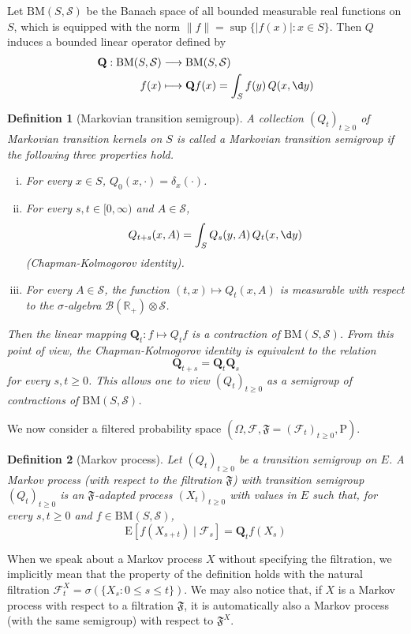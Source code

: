 \documentclass{report}
\newtheorem{definition}{Definition}[section]
\theoremstyle{nonumberplain}
\begin{document}
Let $\mathrm{BM}(S,\mathcal{S})$ be the Banach space of all bounded measurable real functions on $S$, which is equipped with the norm $\|f\|=\sup \{|f(x)|: x \in S\}$. Then $Q$ induces a bounded linear operator defined by
\begin{align*}
	\mathbf{Q}:\mathrm{BM}(S,\mathcal{S}) &\longrightarrow\mathrm{BM}(S,\mathcal{S}) \\
	f(x) &\longmapsto \mathbf{Q}f(x)=\int_S f(y)\,Q(x,\d y)
\end{align*}

\begin{definition}[Markovian transition
	semigroup]
	A collection $\left(Q_t\right)_{t \geq 0}$ of Markovian transition kernels on $S$ is called a \emph{Markovian transition semigroup} if the following three properties hold.
	\begin{enumerate}[(i)]
	\item For every $x \in S$, $Q_0(x, \cdot)=\delta_x(\cdot)$.
	\item For every $s, t \in [0, \infty)$ and $A \in \mathcal{S}$,
	$$
	Q_{t+s}(x, A)=\int_S Q_s(y, A)\,Q_t(x,\d y) 
	$$
	(Chapman-Kolmogorov identity).
	\item For every $A \in \mathcal{S}$, the function $(t, x) \mapsto Q_t(x, A)$ is measurable with respect to the $\sigma$-algebra  $\mathcal{B}\left(\mathbb{R}_{+}\right) \otimes \mathcal{S}$.
\end{enumerate}
	Then the linear mapping $\mathbf{Q}_t: f \mapsto Q_t f$ is a contraction of $\mathrm{BM}(S,\mathcal{S})$. From this point of view, the Chapman-Kolmogorov identity is equivalent to the relation
	$$
	\mathbf{Q}_{t+s}=\mathbf{Q}_t\mathbf{Q}_s
	$$
	for every $s, t \geq 0$. This allows one to view $\left(Q_t\right)_{t \geq 0}$ as a semigroup of contractions of $\mathrm{BM}(S,\mathcal{S})$.
\end{definition}	
We now consider a filtered probability space $\left(\Omega, \mathcal{F},\mathfrak{F}=\left(\mathcal{F}_t\right)_{t \ge 0}, \mathrm{P}\right)$.
\begin{definition}[Markov process]
Let $\left(Q_t\right)_{t \geq 0}$ be a transition semigroup on $E$. A Markov process (with respect to the filtration $\mathfrak{F}$) with transition semigroup $\left(Q_t\right)_{t \geq 0}$ is an $\mathfrak{F}$-adapted process $\left(X_t\right)_{t \geq 0}$ with values in $E$ such that, for every $s, t \geq 0$ and $f \in \mathrm{BM}(S,\mathcal{S})$,
$$
\mathrm{E}\left[f\left(X_{s+t}\right) \mid \mathcal{F}_s\right]=\mathbf{Q}_t f\left(X_s\right)
$$
\end{definition}
When we speak about a Markov process $X$ without specifying the filtration, we implicitly mean that the property of
 the definition holds with the natural filtration $\mathcal{F}_t^X=\sigma \left(\{X_{s}:0\le s\le t\}\right)$. We may also notice that, if $X$ is a Markov process with respect to a filtration $\mathfrak{F}$, it is automatically also a Markov
 process (with the same semigroup) with respect to $\mathfrak{F}^X$.
\end{document}
